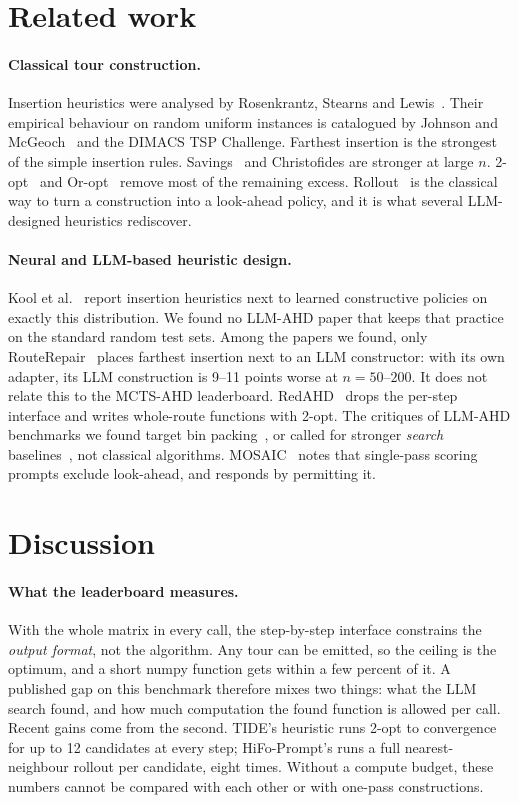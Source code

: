\section{Related work}\label{sec:related}
\paragraph{Classical tour construction.} Insertion heuristics were analysed by Rosenkrantz, Stearns
and Lewis~\cite{rosenkrantz}. Their empirical behaviour on random uniform instances is catalogued by
Johnson and McGeoch~\cite{johnson} and the DIMACS TSP Challenge. Farthest insertion is the
strongest of the simple insertion rules. Savings~\cite{clarke} and Christofides are stronger at
large $n$. 2-opt~\cite{croes} and Or-opt~\cite{or} remove most of the remaining excess.
Rollout~\cite{bertsekas} is the classical way to turn a construction into a look-ahead policy, and
it is what several LLM-designed heuristics rediscover.

\paragraph{Neural and LLM-based heuristic design.} Kool et al.~\cite{kool} report insertion
heuristics next to learned constructive policies on exactly this distribution. We found no LLM-AHD paper that keeps that practice on the standard random test sets. Among the papers we found, only RouteRepair~\cite{routerepair}
places farthest insertion next to an LLM constructor: with its own adapter, its LLM construction is 9--11 points worse at $n=50$--$200$. It does not relate this to the MCTS-AHD leaderboard. RedAHD~\cite{redahd}
drops the per-step interface and writes whole-route functions with 2-opt. The critiques of LLM-AHD benchmarks we found target bin packing~\cite{herrmann,sim}, or called for stronger
\emph{search} baselines~\cite{zhang}, not classical algorithms. MOSAIC~\cite{mosaic} notes that
single-pass scoring prompts exclude look-ahead, and responds by permitting it.

\section{Discussion}\label{sec:discussion}
\paragraph{What the leaderboard measures.} With the whole matrix in every call, the step-by-step
interface constrains the \emph{output format}, not the algorithm. Any tour can be emitted, so the
ceiling is the optimum, and a short numpy function gets within a few percent of it. A published gap
on this benchmark therefore mixes two things: what the LLM search found, and how much computation
the found function is allowed per call. Recent gains come from the second. TIDE's heuristic runs
2-opt to convergence for up to 12 candidates at every step; HiFo-Prompt's runs a full
nearest-neighbour rollout per candidate, eight times. Without a compute budget, these numbers cannot
be compared with each other or with one-pass constructions.

